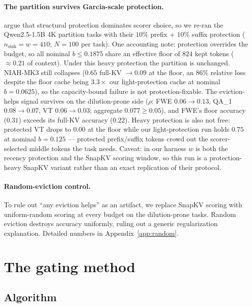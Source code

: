 \documentclass{article}
\begin{document}
\paragraph{The partition survives Garcia-scale protection.}
\citet{arxiv260518053} argue that structural protection dominates scorer
choice, so we re-ran the Qwen2.5-1.5B 4K partition tasks with their
$10\%$ prefix $+$ $10\%$ suffix protection ($n_{\text{sink}} = w = 410$;
$N = 100$ per task). One accounting note: protection overrides the
budget, so all nominal $b \le 0.1875$ share an effective floor of $824$
kept tokens ($\approx 0.21$ of context). Under this heavy protection the
partition is unchanged. NIAH-MK3 still collapses ($0.65$ full-KV $\to
0.09$ at the floor, an $86\%$ relative loss despite the floor cache being
$3.3\times$ our light-protection cache at nominal $b = 0.0625$), so the
capacity-bound failure is not protection-fixable. The eviction-helps
signal survives on the dilution-prone side ($\rho$: FWE $0.06 \to 0.13$,
QA\_1 $0.08 \to 0.07$, VT $0.06 \to 0.03$; aggregate $0.077 \ge 0.05$),
and FWE's floor accuracy ($0.31$) exceeds its full-KV accuracy ($0.22$).
Heavy protection is also not free: protected VT drops to $0.00$ at the
floor while our light-protection run holds $0.75$ at nominal $b = 0.125$
--- protected prefix/suffix tokens crowd out the scorer-selected middle
tokens the task needs. Caveat: in our harness $w$ is both the recency
protection and the SnapKV scoring window, so this run is a
protection-heavy SnapKV variant rather than an exact replication of
their protocol.

\paragraph{Random-eviction control.} To rule out ``any eviction helps'' as an
artifact, we replace SnapKV scoring with uniform-random scoring at every
budget on the dilution-prone tasks. Random eviction destroys accuracy uniformly,
ruling out a generic regularization explanation. Detailed numbers in
Appendix~\ref{app:random}.

\section{The gating method}
\label{sec:method}

\subsection{Algorithm}
\label{subsec:algo}
\end{document}
